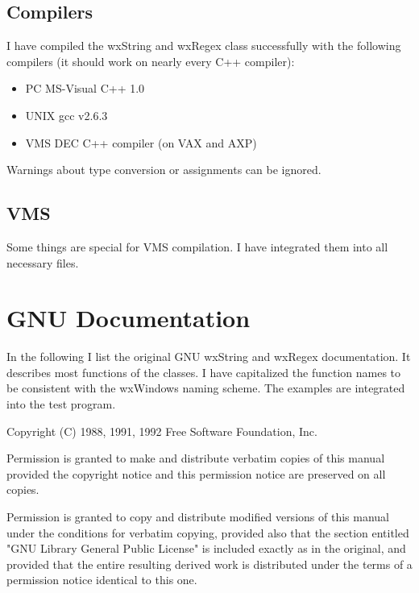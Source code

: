 \section{Compilers}
%
\setfooter{\thepage}{}{}{}{}{\thepage}
I have compiled the wxString and wxRegex class successfully with the following
compilers (it should work on nearly every C++ compiler):
\begin{itemize}
\itemsep=0pt
\item PC    MS-Visual C++ 1.0
\item UNIX  gcc v2.6.3
\item VMS   DEC C++ compiler (on VAX and AXP)
\end{itemize}
Warnings about type conversion or assignments can be ignored.


\section{VMS}
%
\setfooter{\thepage}{}{}{}{}{\thepage}
Some things are special for VMS compilation. I have integrated them
into all necessary files.



\chapter{GNU Documentation}
%
\setfooter{\thepage}{}{}{}{}{\thepage}

In the following I list the original GNU wxString and wxRegex
documentation. It describes most functions of the classes.
I have capitalized the function names to be consistent with
the wxWindows naming scheme.
The examples are integrated into the test program.

Copyright (C) 1988, 1991, 1992 Free Software Foundation, Inc.

Permission is granted to make and distribute verbatim copies of this
manual provided the copyright notice and this permission notice are
preserved on all copies.

Permission is granted to copy and distribute modified versions of
this manual under the conditions for verbatim copying, provided also
that the section entitled "GNU Library General Public License" is
included exactly as in the original, and provided that the entire
resulting derived work is distributed under the terms of a permission
notice identical to this one.

